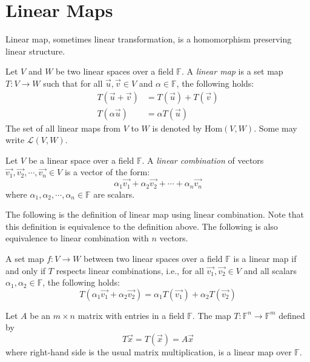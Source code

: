 \documentclass[
	11pt, %
	fleqn, %
	a4paper, %
]{LegrandOrangeBook}
\newcommand{\Hom}[2]{\text{Hom}(#1, #2)} %
\newcommand{\F}{\mathbb{F}} %
\begin{document}
\section{Linear Maps}

Linear map, sometimes linear transformation, is a homomorphism preserving linear structure.

\begin{definition}
    Let $V$ and $W$ be two linear spaces over a field $\F$. A \emph{linear map} is a set map $T: V \to W$ such that for all $\vec{u}, \vec{v} \in V$ and $\alpha \in \F$, the following holds:
    \[
        \begin{split}
            T(\vec{u} + \vec{v}) &= T(\vec{u}) + T(\vec{v}) \\
            T(\alpha \vec{u}) &= \alpha T(\vec{u})
        \end{split}
    \]
    The set of all linear maps from $V$ to $W$ is denoted by $\Hom{V}{W}$. Some may write $\mathcal{L}(V, W)$.
\end{definition}

\begin{definition}
    Let $V$ be a linear space over a field $\F$. A \emph{linear combination} of vectors $\vec{v_1}, \vec{v_2}, \cdots, \vec{v_n} \in V$ is a vector of the form:
    \[
        \alpha_1 \vec{v_1} + \alpha_2 \vec{v_2} + \cdots + \alpha_n \vec{v_n}
    \]
    where $\alpha_1, \alpha_2, \cdots, \alpha_n \in \F$ are scalars.
\end{definition}

The following is the definition of linear map using linear combination. Note that this definition is equivalence to the definition above. The following is also equivalence to linear combination with $n$ vectors.

\begin{corollary}
    A set map $f: V \to W$ between two linear spaces over a field $\F$ is a linear map if and only if $T$ respects linear combinations, i.e., for all $\vec{v_1}, \vec{v_2} \in V$ and all scalars $\alpha_1, \alpha_2 \in \F$, the following holds:
    \[
        T(\alpha_1 \vec{v_1} + \alpha_2 \vec{v_2}) = \alpha_1 T(\vec{v_1}) + \alpha_2 T(\vec{v_2})
    \]
\end{corollary}

\begin{example}
    Let $A$ be an $m \times n$ matrix with entries in a field $\F$. The map $T: \F^n \to \F^m$ defined by
    \[
        T\vec{x} = T(\vec{x}) = A \vec{x}
    \]
    where right-hand side is the usual matrix multiplication, is a linear map over $\F$.
\end{example}
\end{document}
